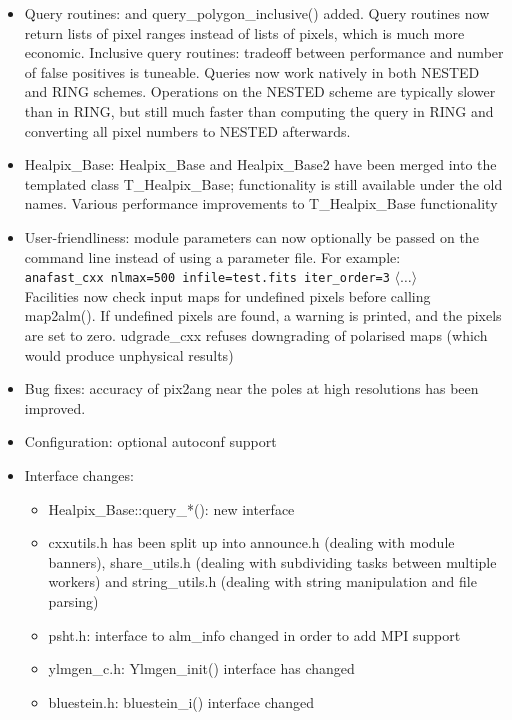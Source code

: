 \documentclass[12pt,twoside]{article}
\makeatletter
\newcommand{\nop}[1]{\Hy@raisedlink{\hypertarget{#1}{}}}
\newcommand{\mytarget}[1]{\nop{#1}}%
\newcommand{\mytarget}[1]{\label{#1}}
\makeatother
\begin{document}
{{
\begin{itemize}
	\setlength{\itemsep}{0pt}
	\setlength{\parsep}{0pt}
	\item Query routines:
 \mytarget{install:cpp:query}{query\_polygon()} and query\_polygon\_inclusive() added.
Query routines now return lists of pixel ranges instead of lists of pixels,
 which is much more economic.
Inclusive query routines: tradeoff between performance and number of false
 positives is tuneable.
Queries now work natively in both NESTED and RING schemes. Operations on
 the NESTED scheme are typically slower than in RING, but still much faster
 than computing the query in RING and converting all pixel numbers to NESTED
 afterwards.

\item Healpix\_Base:
Healpix\_Base and Healpix\_Base2 have been merged into the templated class
 T\_Healpix\_Base; functionality is still available under the old names.
Various performance improvements to T\_Healpix\_Base functionality

\item User-friendliness:
module parameters can now optionally be passed on the command line instead
 of using a parameter file. For example:\\
   {\tt anafast\_cxx nlmax=500 infile=test.fits iter\_order=3} $\langle\ldots\rangle$\\
Facilities now check input maps for undefined pixels before calling map2alm().
 If undefined pixels are found, a warning is printed, and the pixels are set
 to zero. udgrade\_cxx refuses downgrading of polarised maps (which would produce
 unphysical results)
%
\item Bug fixes: accuracy of pix2ang near the poles at high resolutions has been improved.
%
\item Configuration: optional autoconf support
%
\item Interface changes:
%
\begin{itemize}
	\setlength{\itemsep}{0pt}
	\setlength{\parsep}{0pt}
\item Healpix\_Base::query\_*(): new interface
\item cxxutils.h has been split up into
 announce.h (dealing with module banners), 
 share\_utils.h (dealing with subdividing tasks between multiple workers) and
 string\_utils.h (dealing with string manipulation and file parsing)
\item psht.h: interface to alm\_info changed in order to add MPI support
\item ylmgen\_c.h: Ylmgen\_init() interface has changed
\item bluestein.h: bluestein\_i() interface changed
\end{itemize}


\end{itemize}}}
\end{document}
